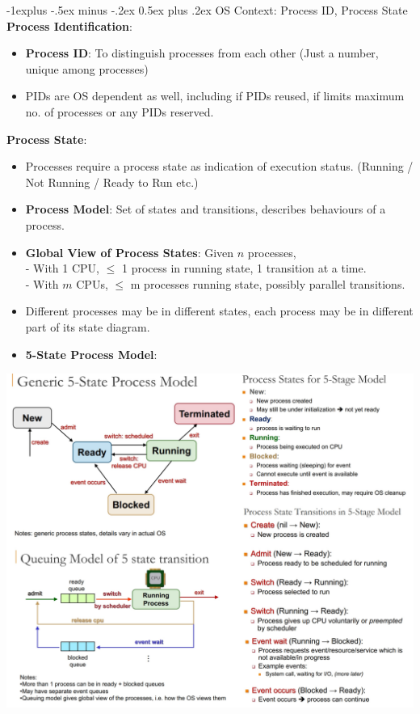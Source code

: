\documentclass[10pt, landscape]{article}
\makeatletter
\renewcommand{\subsection}{\@startsection{subsection}{2}{0mm}%
                                {-1explus -.5ex minus -.2ex}%
                                {0.5ex plus .2ex}%
                                {\normalfont\normalsize\bfseries}}
\makeatother
\begin{document}
\begin{multicols*}{3}
\subsection{OS Context: Process ID, Process State}
\textbf{Process Identification}:
\begin{itemize}
\item \textbf{Process ID}: To distinguish processes from each other (Just a number, unique among processes)
\item PIDs are OS dependent as well, including if PIDs reused, if limits maximum no. of processes or any PIDs reserved.
\end{itemize}
\textbf{Process State}:
\begin{itemize}
\item Processes require a process state as indication of execution status. (Running / Not Running / Ready to Run etc.)
\item \textbf{Process Model}: Set of states and transitions, describes behaviours of a process.
\item \textbf{Global View of Process States}: Given $n$ processes, \\
- With 1 CPU, $\leq$ 1 process in running state, 1 transition at a time. \\
- With $m$ CPUs, $\leq$ m processes running state, possibly parallel transitions.
\item Different processes may be in different states, each process may be in different part of its state diagram.
\item \textbf{5-State Process Model}: 
\end{itemize}
\centerline{\includegraphics[width=1\linewidth]{5StateProcess}}


\end{multicols*}
\end{document}
